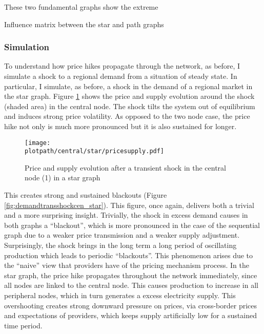 These two fundamental graphs show the extreme

\begin{table}[H]
  \centering
  
  \caption{Influence matrix between the star and path graphs}
  \label{table:influence}
\end{table}

\subsubsection{Simulation}

To understand how price hikes propagate through the network, as before, I simulate a shock to a regional demand from a situation of steady state. In particular, I simulate, as before, a shock in the demand of a regional market in the star graph. Figure \ref{fig:transshockcen_star} shows the price and supply evolution around the shock (shaded area) in the central node. The shock tilts the system out of equilibrium and induces strong price volatility. As opposed to the two node case, the price hike not only is much more pronounced but it is also sustained for longer.

\begin{figure}[H]
  \centering
  \texttt{[image: \\plotpath/central/star/pricesupply.pdf]}
  \caption{Price and supply evolution after a transient shock in the central node (1) in a star graph} \label{fig:transshockcen_star}
\end{figure}

This creates strong and sustained blackouts (Figure \ref{fig:demandtransshockcen_star}). This figure, once again, delivers both a trivial and a more surprising insight. Trivially, the shock in excess demand causes in both graphs a ``blackout'', which is more pronounced in the case of the sequential graph due to a weaker price transmission and a weaker supply adjustment. Surprisingly, the shock brings in the long term a long period of oscillating production which leads to periodic ``blackouts''. This phenomenon arises due to the ``naive'' view that providers have of the pricing mechanism process. In the star graph, the price hike propagates throughout the network immediately, since all nodes are linked to the central node. This causes production to increase in all peripheral nodes, which in turn generates a excess electricity supply. This overshooting creates strong downward pressure on prices, via cross-border prices and expectations of providers, which keeps supply artificially low for a sustained time period.

